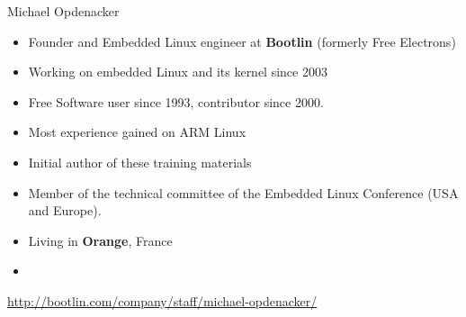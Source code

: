 \begin{frame}{Michael Opdenacker}
    \begin{itemize}
	\item Founder and Embedded Linux engineer at {\bf Bootlin}
	      (formerly Free Electrons)
	\item Working on embedded Linux and its kernel since 2003
	\item Free Software user since 1993, contributor since 2000.
	\item Most experience gained on ARM Linux
	\item Initial author of these training materials
	\item Member of the technical committee of the Embedded Linux
	      Conference (USA and Europe).
	\item Living in {\bf Orange}, France
	\item {}
    \end{itemize}
    {\small \url{http://bootlin.com/company/staff/michael-opdenacker/}}
\end{frame}
